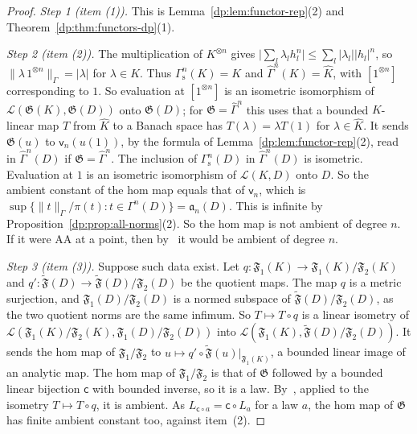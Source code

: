 \documentclass[11pt]{amsart}
\theoremstyle{definition}
\theoremstyle{remark}
\numberwithin{equation}{section}
\newcommand{\cL}{\mathcal L}
\newcommand{\abs}[1]{\lvert #1\rvert}
\newcommand{\norm}[1]{\lVert #1\rVert}
\newcommand{\Kh}{\widehat K}
\theoremstyle{plain}
\theoremstyle{definition}
\theoremstyle{plain}
\newcommand{\hGamma}{\widehat\Gamma}
\begin{document}
\begin{proof}
\emph{Step 1 (item (1)).} This is Lemma~\ref{dp:lem:functor-rep}(2) and Theorem~\ref{dp:thm:functors-dp}(1).

\emph{Step 2 (item (2)).} The multiplication of $K^{\otimes n}$ gives $\abs{\sum_l\lambda_lh_l^n}\le\sum_l\abs{\lambda_l}\abs{h_l}^n$, so $\norm{\lambda\,1^{\otimes n}}_\Gamma=\abs\lambda$ for $\lambda\in K$. Thus $\Gamma^n_{\mathrm s}(K)=K$ and $\hGamma^n(K)=\Kh$, with $[1^{\otimes n}]$ corresponding to $1$. So evaluation at $[1^{\otimes n}]$ is an isometric isomorphism of $\cL(\mathfrak G(K),\mathfrak G(D))$ onto $\mathfrak G(D)$; for $\mathfrak G=\hGamma^n$ this uses that a bounded $K$-linear map $T$ from $\Kh$ to a Banach space has $T(\lambda)=\lambda T(1)$ for $\lambda\in\Kh$. It sends $\mathfrak G(u)$ to $\mathsf v_n(u(1))$, by the formula of Lemma~\ref{dp:lem:functor-rep}(2), read in $\hGamma^n(D)$ if $\mathfrak G=\hGamma^n$. The inclusion of $\Gamma^n_{\mathrm s}(D)$ in $\hGamma^n(D)$ is isometric. Evaluation at $1$ is an isometric isomorphism of $\cL(K,D)$ onto $D$. So the ambient constant of the hom map equals that of $\mathsf v_n$, which is $\sup\{\norm t_\Gamma/\pi(t):t\in\Gamma^n(D)\}=\mathfrak a_n(D)$. This is infinite by Proposition~\ref{dp:prop:all-norms}(2). So the hom map is not ambient of degree $n$. If it were AA at a point, then by~\cite[Proposition~14.9(2)]{I} it would be ambient of degree $n$.

\emph{Step 3 (item (3)).} Suppose such data exist. Let $q\colon\mathfrak F_1(K)\to\mathfrak F_1(K)/\mathfrak F_2(K)$ and $q'\colon\widetilde{\mathfrak F}(D)\to\widetilde{\mathfrak F}(D)/\mathfrak F_2(D)$ be the quotient maps. The map $q$ is a metric surjection, and $\mathfrak F_1(D)/\mathfrak F_2(D)$ is a normed subspace of $\widetilde{\mathfrak F}(D)/\mathfrak F_2(D)$, as the two quotient norms are the same infimum. So $T\mapsto T\circ q$ is a linear isometry of $\cL(\mathfrak F_1(K)/\mathfrak F_2(K),\mathfrak F_1(D)/\mathfrak F_2(D))$ into $\cL(\mathfrak F_1(K),\widetilde{\mathfrak F}(D)/\mathfrak F_2(D))$. It sends the hom map of $\mathfrak F_1/\mathfrak F_2$ to $u\mapsto q'\circ\widetilde{\mathfrak F}(u)|_{\mathfrak F_1(K)}$, a bounded linear image of an analytic map. The hom map of $\mathfrak F_1/\mathfrak F_2$ is that of $\mathfrak G$ followed by a bounded linear bijection $\mathsf c$ with bounded inverse, so it is a law. By~\cite[Proposition~14.9(2)]{I}, applied to the isometry $T\mapsto T\circ q$, it is ambient. As $L_{\mathsf c\circ a}=\mathsf c\circ L_a$ for a law $a$, the hom map of $\mathfrak G$ has finite ambient constant too, against item~(2).
\end{proof}
\end{document}
